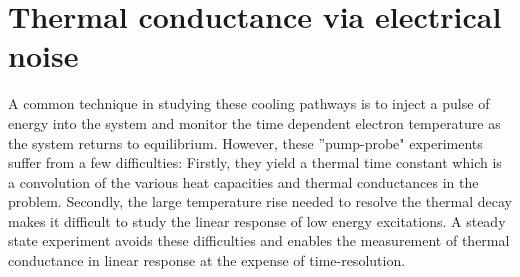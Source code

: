 \chapter{Thermal conductance via electrical noise}
\label{ch:thermal_conductance_via_electrical_noise}
A common technique in studying these cooling pathways is to inject a pulse of energy into the system and monitor the time dependent electron temperature as the system returns to equilibrium. However, these ''pump-probe" experiments suffer from a few difficulties: Firstly, they yield a thermal time constant which is a convolution of the various heat capacities and thermal conductances in the problem. Secondly, the large temperature rise needed to resolve the thermal decay makes it difficult to study the linear response of low energy excitations. A steady state experiment avoids these difficulties and enables the measurement of thermal conductance in linear response at the expense of time-resolution.

